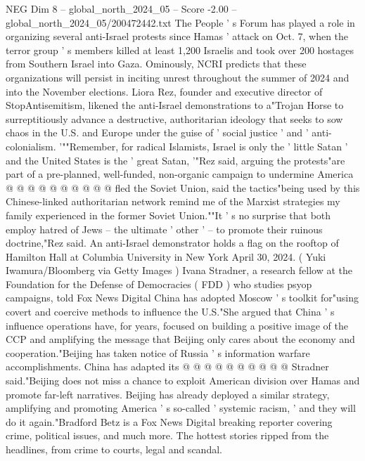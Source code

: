 \begin{textsample}{NEG Dim 8 – global\_north\_2024\_05 – Score -2.00 – global\_north\_2024\_05/200472442.txt}
The People ' s Forum has played a role in organizing several anti-Israel protests since Hamas ' attack on Oct. 7, when the terror group ' s members killed at least 1,200 Israelis and took over 200 hostages from Southern Israel into Gaza.
Ominously, NCRI predicts that these organizations will persist in inciting unrest throughout the summer of 2024 and into the November elections.
Liora Rez, founder and executive director of StopAntisemitism, likened the anti-Israel demonstrations to a"Trojan Horse to surreptitiously advance a destructive, authoritarian ideology that seeks to sow chaos in the U.S. and Europe under the guise of ' social justice ' and ' anti-colonialism. '""Remember, for radical Islamists, Israel is only the ' little Satan ' and the United States is the ' great Satan, '"Rez said, arguing the protests"are part of a pre-planned, well-funded, non-organic campaign to undermine America @ @ @ @ @ @ @ @ @ @ fled the Soviet Union, said the tactics"being used by this Chinese-linked authoritarian network remind me of the Marxist strategies my family experienced in the former Soviet Union.""It ' s no surprise that both employ hatred of Jews -- the ultimate ' other ' -- to promote their ruinous doctrine,"Rez said.
An anti-Israel demonstrator holds a flag on the rooftop of Hamilton Hall at Columbia University in New York April 30, 2024. ( Yuki Iwamura/Bloomberg via Getty Images ) Ivana Stradner, a research fellow at the Foundation for the Defense of Democracies ( FDD ) who studies psyop campaigns, told Fox News Digital China has adopted Moscow ' s toolkit for"using covert and coercive methods to influence the U.S."She argued that China ' s influence operations have, for years, focused on building a positive image of the CCP and amplifying the message that Beijing only cares about the economy and cooperation."Beijing has taken notice of Russia ' s information warfare accomplishments.
China has adapted its @ @ @ @ @ @ @ @ @ @ Stradner said."Beijing does not miss a chance to exploit American division over Hamas and promote far-left narratives.
Beijing has already deployed a similar strategy, amplifying and promoting America ' s so-called ' systemic racism, ' and they will do it again."Bradford Betz is a Fox News Digital breaking reporter covering crime, political issues, and much more.
The hottest stories ripped from the headlines, from crime to courts, legal and scandal.

\end{textsample}
